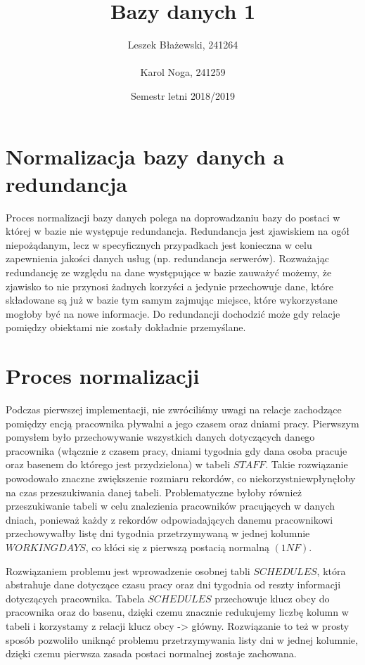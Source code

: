\documentclass[a4paper]{article}
\title{Bazy danych 1}
\author{Leszek Błażewski, 241264 \\ \\Karol Noga, 241259}
\date{Semestr letni 2018/2019}
\begin{document}
\maketitle

\newpage

\section{Normalizacja bazy danych a redundancja}

Proces normalizacji bazy danych polega na doprowadzaniu bazy do postaci w której w bazie nie występuje redundancja. Redundancja jest zjawiskiem na ogół niepożądanym, lecz w specyficznych przypadkach jest konieczna w celu zapewnienia jakości danych usług (np. redundancja serwerów). Rozważając redundancję ze względu na dane występujące w bazie zauważyć możemy, że zjawisko to nie przynosi żadnych korzyści a jedynie przechowuje dane, które składowane są już w bazie tym samym zajmując miejsce, które wykorzystane mogłoby być na nowe informacje. Do redundancji dochodzić może gdy relacje pomiędzy obiektami nie zostały dokładnie przemyślane.

\section{Proces normalizacji}

Podczas pierwszej implementacji, nie zwróciliśmy uwagi na relacje zachodzące pomiędzy encją pracownika pływalni a jego czasem oraz dniami pracy. Pierwszym pomysłem było przechowywanie wszystkich danych dotyczących danego pracownika (włącznie z czasem pracy, dniami tygodnia gdy dana osoba pracuje oraz basenem do którego jest przydzielona) w tabeli $STAFF$. Takie rozwiązanie powodowało znaczne zwiększenie rozmiaru rekordów, co niekorzystnie\linebreak wpłynęłoby na czas przeszukiwania danej tabeli. Problematyczne byłoby również przeszukiwanie tabeli w celu znalezienia pracowników pracujących w danych dniach, ponieważ każdy z rekordów odpowiadających danemu pracownikowi przechowywałby listę dni tygodnia przetrzymywaną w jednej kolumnie \linebreak $WORKINGDAYS$, co kłóci się z pierwszą postacią normalną $(1NF)$.

\vspace{5mm}
Rozwiązaniem problemu jest wprowadzenie osobnej tabli $SCHEDULES$, która abstrahuje dane dotyczące czasu pracy oraz dni tygodnia od reszty informacji dotyczących pracownika. Tabela $SCHEDULES$ przechowuje klucz obcy do pracownika oraz do basenu, dzięki czemu znacznie redukujemy liczbę kolumn w tabeli i korzystamy z relacji klucz obcy -> główny. Rozwiązanie to też w prosty sposób pozwoliło uniknąć problemu przetrzymywania listy dni w jednej kolumnie, dzięki czemu pierwsza zasada postaci normalnej zostaje zachowana.
\end{document}
